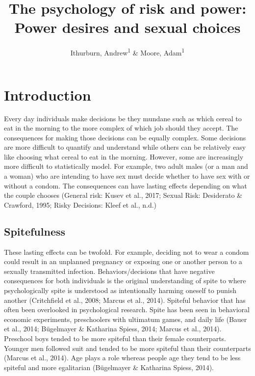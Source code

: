 \documentclass[
  english,
  a4paper]{apa7}
\title{The psychology of risk and power: Power desires and sexual choices}
\author{Ithurburn, Andrew\textsuperscript{1} \& Moore, Adam\textsuperscript{1}}
\date{}
\affiliation{\vspace{0.5cm}\textsuperscript{1} The University of Edinburgh}
\begin{document}
\maketitle

\hypertarget{introduction}{%
\section{Introduction}\label{introduction}}

Every day individuals make decisions be they mundane such as which cereal to eat in the morning to the more complex of which job should they accept. The consequences for making those decisions can be equally complex. Some decisions are more difficult to quantify and understand while others can be relatively easy like choosing what cereal to eat in the morning. However, some are increasingly more difficult to statistically model. For example, two adult males (or a man and a woman) who are intending to have sex must decide whether to have sex with or without a condom. The consequences can have lasting effects depending on what the couple chooses (General risk: Kusev et al., 2017; Sexual Risk: Desiderato \& Crawford, 1995; Risky Decisions: Kleef et al., n.d.)

\hypertarget{spitefulness}{%
\subsection{Spitefulness}\label{spitefulness}}

These lasting effects can be twofold. For example, deciding not to wear a condom could result in an unplanned pregnancy or exposing one or another person to a sexually transmitted infection. Behaviors/decisions that have negative consequences for both individuals is the original understanding of spite to where psychologically spite is understood as intentionally harming oneself to punish another (Critchfield et al., 2008; Marcus et al., 2014). Spiteful behavior that has often been overlooked in psychological research. Spite has been seen in behavioral economic experiments, preschoolers with ultimatum games, and daily life (Bauer et al., 2014; Bügelmayer \& Katharina Spiess, 2014; Marcus et al., 2014). Preschool boys tended to be more spiteful than their female counterparts. Younger men followed suit and tended to be more spiteful than their counterparts (Marcus et al., 2014). Age plays a role whereas people age they tend to be less spiteful and more egalitarian (Bügelmayer \& Katharina Spiess, 2014).
\end{document}
